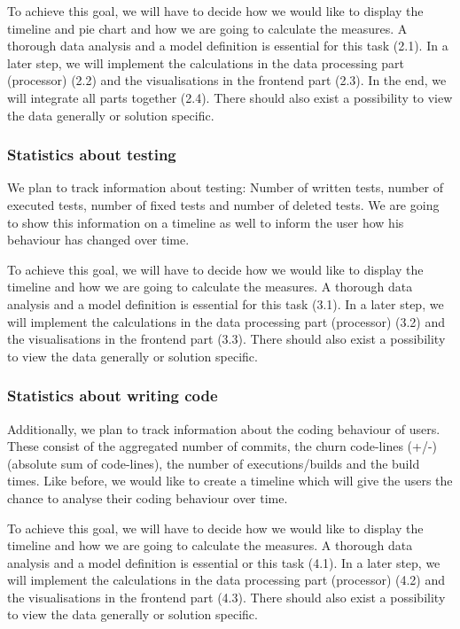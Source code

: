 \documentclass{seal_article}
\begin{document}
To achieve this goal, we will have to decide how we would like to display the timeline and pie chart and how we are going to calculate the measures. A thorough data analysis and a model definition is essential for this task (2.1). In a later step, we will implement the calculations in the data processing part (processor) (2.2) and the visualisations in the frontend part (2.3). In the end, we will integrate all parts together (2.4). There should also exist a possibility to ​view the data generally or solution specific.

\subsubsection{Statistics about testing}
We plan to track information about testing: Number of written tests, number of executed tests, number of fixed tests and number of deleted tests. We are going to show this information on a timeline as well to inform the user how his behaviour has changed over time.

To achieve this goal, we will have to decide how we would like to display the timeline and how we are going to calculate the measures. A thorough data analysis and a model definition is essential for this task (3.1). In a later step, we will implement the calculations in the data processing part (processor) (3.2) and the visualisations in the frontend part (3.3). There should also exist a possibility to ​view the data generally or solution specific.

\subsubsection{Statistics about writing code}
Additionally, we plan to track information about the coding behaviour of users. These consist of the aggregated number of commits, the ​churn code-lines (+/-) (absolute sum of code-lines), the number of executions/builds and the build times. Like before, we would like to create a timeline which will give the users the chance to analyse their coding behaviour over time.

To achieve this goal, we will have to decide how we would like to display the timeline and how we are going to calculate the measures. A thorough data analysis and a model definition is essential or this task (4.1). In a later step, we will implement the calculations in the data processing part (processor) (4.2) and the visualisations in the frontend part (4.3). There should also exist a possibility to ​view the data generally or solution specific.
\end{document}
